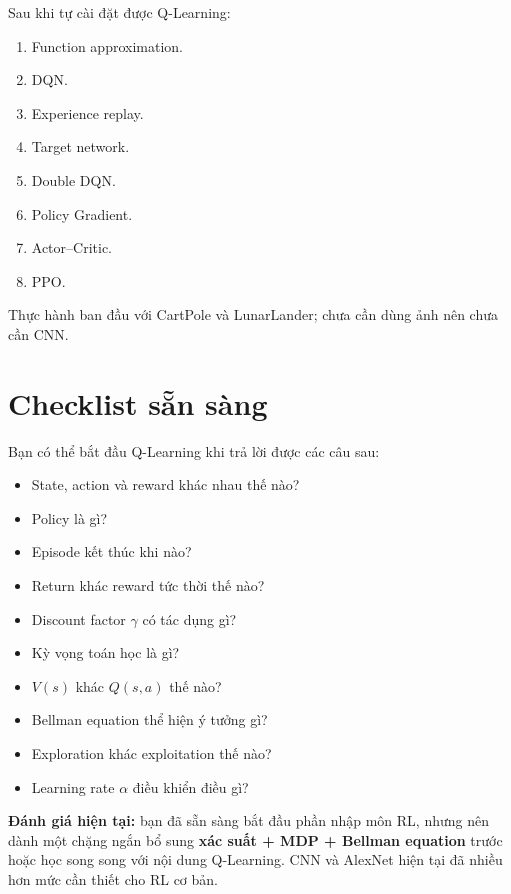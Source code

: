 \documentclass[12pt,a4paper]{article}
\begin{document}
Sau khi tự cài đặt được Q-Learning:

\begin{enumerate}[leftmargin=1.8em]
    \item Function approximation.
    \item DQN.
    \item Experience replay.
    \item Target network.
    \item Double DQN.
    \item Policy Gradient.
    \item Actor--Critic.
    \item PPO.
\end{enumerate}

Thực hành ban đầu với CartPole và LunarLander; chưa cần dùng ảnh nên chưa cần CNN.

\section{Checklist sẵn sàng}

Bạn có thể bắt đầu Q-Learning khi trả lời được các câu sau:

\begin{itemize}[leftmargin=1.5em]
    \item State, action và reward khác nhau thế nào?
    \item Policy là gì?
    \item Episode kết thúc khi nào?
    \item Return khác reward tức thời thế nào?
    \item Discount factor $\gamma$ có tác dụng gì?
    \item Kỳ vọng toán học là gì?
    \item $V(s)$ khác $Q(s,a)$ thế nào?
    \item Bellman equation thể hiện ý tưởng gì?
    \item Exploration khác exploitation thế nào?
    \item Learning rate $\alpha$ điều khiển điều gì?
\end{itemize}

\textbf{Đánh giá hiện tại:} bạn đã sẵn sàng bắt đầu phần nhập môn RL, nhưng nên dành một chặng ngắn bổ sung \textbf{xác suất + MDP + Bellman equation} trước hoặc học song song với nội dung Q-Learning. CNN và AlexNet hiện tại đã nhiều hơn mức cần thiết cho RL cơ bản.
\end{document}
